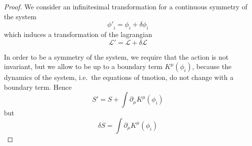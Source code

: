     \begin{proof}
        We consider an infinitesimal transformation for a continuous symmetry of the system
        \begin{equation*}
            {\phi'}_i = \phi_i + \delta \phi_i
        \end{equation*}
        which induces a transformation of the lagrangian 
        \begin{equation*}
            \mathcal L' = \mathcal L + \delta \mathcal L
        \end{equation*}
        
        In order to be a symmetry of the system, we require that the action is not invariant, but we allow to be up to a boundary term $K^\mu(\phi_i)$, because the dynamics of the system, i.e.~the equations of tmotion, do not change with a boundary term. Hence 
        \begin{equation*}
            S' = S + \int \partial_\mu K^\mu(\phi_i)
        \end{equation*}
        but 
        \begin{equation}\label{symm}
            \delta S = \int \partial_\mu K^\mu(\phi_i)
        \end{equation}


\end{proof}
